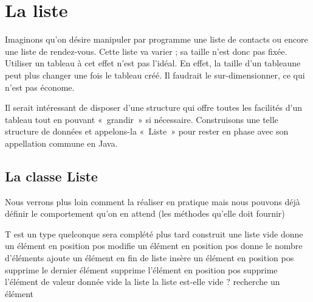 \chapter{La liste}


Imaginons qu’on désire manipuler par programme une liste de contacts ou
encore une liste de rendez-vous. Cette liste va varier ; sa taille
n’est donc pas fixée. Utiliser un tableau à cet effet n’est pas l’idéal. 
En effet, la taille d’un tableaune peut plus changer une fois le tableau créé. 
Il faudrait le sur-dimensionner, ce qui n’est pas économe.

Il serait intéressant de disposer d’une structure qui offre toutes les
facilités d’un tableau tout en pouvant «~grandir~» si nécessaire.
Construisons une telle structure de données et appelons-la «~Liste~»
pour rester en phase avec son appellation commune en Java.

\section{La classe Liste}

Nous verrons plus loin comment la réaliser en pratique mais nous pouvons
déjà définir le comportement qu’on en attend (les méthodes qu’elle doit
fournir)

\begin{Pseudocode}
		\RComment T est un type quelconque
		\Private
			\LComment sera complété plus tard	
		\Public
				\RComment construit une liste vide
				\RComment donne un élément en position pos
				\RComment modifie un élément en position pos
				\RComment donne le nombre d’éléments
				\RComment ajoute un élément en fin de liste
				\RComment insère un élément en position pos
				\RComment supprime le dernier élément
				\RComment supprime l'élément en position pos
				\RComment supprime l'élément de valeur donnée
				\RComment vide la liste
				\RComment la liste est-elle vide ?
				\RComment recherche un élément
		\EndClass
\end{Pseudocode}

